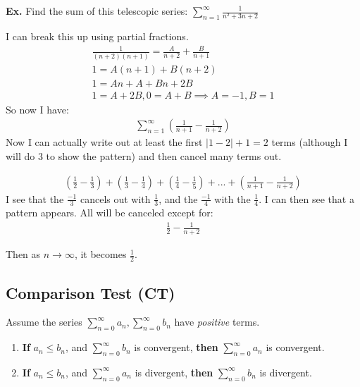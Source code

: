 \documentclass[12pt,letterpaper]{article} \usepackage{amsmath} \usepackage{graphicx}  \usepackage{longtable}  \usepackage{amssymb}
\begin{document}
        \begin{mdframed}
            \textbf{Ex.} Find the sum of this telescopic series: $\sum^{\infty}_{n=1}\frac{1}{n^2+3n+2}$

            I can break this up using partial fractions. 
            \begin{align*}
                \frac{1}{(n+2)(n+1)} = \frac{A}{n+2} + \frac{B}{n+1}\\
                1 = A(n+1) + B(n+2)\\
                1 = An + A + Bn + 2B\\
                1 = A + 2B, 0 = A + B \implies A = -1, B = 1
            \end{align*}
            So now I have:
            \begin{align*}
                \sum^{\infty}_{n=1} \left(\frac{1}{n+1} - \frac{1}{n+2}\right)
            \end{align*}
            Now I can actually write out at least the first $|1-2|+1=2$ terms (although I will do 3 to show the pattern) and then cancel many terms out. 

            \begin{align*}
                \left(\frac{1}{2}-\frac{1}{3}\right) + \left(\frac{1}{3}-\frac{1}{4}\right)+\left(\frac{1}{4}-\frac{1}{5}\right) + ... + \left(\frac{1}{n+1}-\frac{1}{n+2}\right)
            \end{align*}
            I see that the $\frac{-1}{3}$ cancels out with $\frac{1}{3}$, and the $\frac{-1}{4}$ with the $\frac{1}{4}$. I can then see that a pattern appears. All will be canceled except for:
            \begin{align*}
                \frac{1}{2} - \frac{1}{n+2}
            \end{align*}

            Then as $n\to\infty$, it becomes $\frac{1}{2}$.
        \end{mdframed}

        \subsection{Comparison Test (CT)}
        Assume the series $\sum_{n=0}^{\infty}a_n, \sum_{n=0}^{\infty}b_n$ have \emph{positive} terms.
        
        \begin{enumerate}
            \item \textbf{If} $a_n \le b_n$, and $\sum_{n=0}^{\infty}b_n$ is convergent, \textbf{then} $\sum_{n=0}^{\infty}a_n$ is convergent.
            \item \textbf{If} $a_n \le b_n$, and $\sum_{n=0}^{\infty}a_n$ is divergent, \textbf{then} $\sum_{n=0}^{\infty}b_n$ is divergent.
        \end{enumerate}
\end{document}
